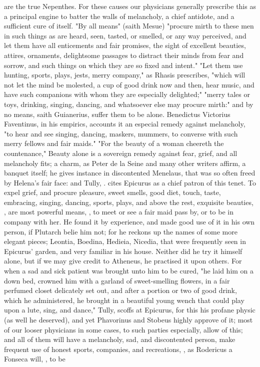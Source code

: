 {are the true Nepenthes. For these causes our physicians generally prescribe this as a principal engine to batter the walls of melancholy, a chief antidote, and a sufficient cure of itself. "By all means" (saith Mesue) "procure mirth to these men in such things as are heard, seen, tasted, or smelled, or any way perceived, and let them have all enticements and fair promises, the sight of excellent beauties, attires, ornaments, delightsome passages to distract their minds from fear and sorrow, and such things on which they are so fixed and intent." "Let them use hunting, sports, plays, jests, merry company," as Rhasis prescribes, "which will not let the mind be molested, a cup of good drink now and then, hear music, and have such companions with whom they are especially delighted;" "merry tales or toys, drinking, singing, dancing, and whatsoever else may procure mirth:" and by no means, saith Guianerius, suffer them to be alone. Benedictus Victorius Faventinus, in his empirics, accounts it an especial remedy against melancholy, "to hear and see singing, dancing, maskers, mummers, to converse with such merry fellows and fair maids." "For the beauty of a woman cheereth the countenance,"  Beauty alone is a sovereign remedy against fear, grief, and all melancholy fits; a charm, as Peter de la Seine and many other writers affirm, a banquet itself; he gives instance in discontented Menelaus, that was so often freed by Helena's fair face: and Tully, . cites Epicurus as a chief patron of this tenet. To expel grief, and procure pleasure, sweet smells, good diet, touch, taste, embracing, singing, dancing, sports, plays, and above the rest, exquisite beauties, , are most powerful means, , to meet or see a fair maid pass by, or to be in company with her. He found it by experience, and made good use of it in his own person, if Plutarch belie him not; for he reckons up the names of some more elegant pieces; Leontia, Boedina, Hedieia, Nicedia, that were frequently seen in Epicurus' garden, and very familiar in his house. Neither did he try it himself alone, but if we may give credit to Atheneus, he practised it upon others. For when a sad and sick patient was brought unto him to be cured, "he laid him on a down bed, crowned him with a garland of sweet-smelling flowers, in a fair perfumed closet delicately set out, and after a portion or two of good drink, which he administered, he brought in a beautiful young wench that could play upon a lute, sing, and dance," \etc{} Tully,  scoffs at Epicurus, for this his profane physic (as well he deserved), and yet Phavorinus and Stobeus highly approve of it; most of our looser physicians in some cases, to such parties especially, allow of this; and all of them will have a melancholy, sad, and discontented person, make frequent use of honest sports, companies, and recreations, , as Rodericus a Fonseca will, , to be }

